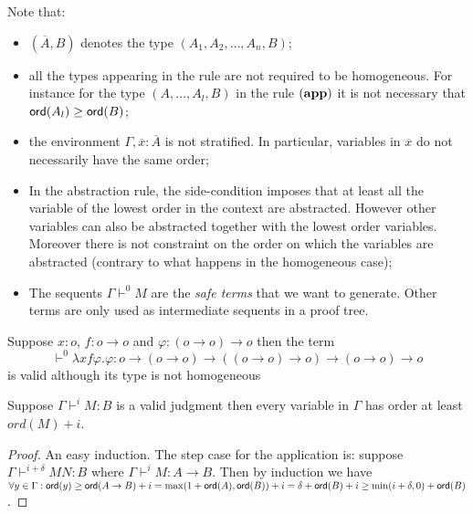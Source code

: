 Note that:
\begin{itemize}
\item $(\overline{A},B)$ denotes the type $(A_1,A_2, \ldots, A_n, B)$;
\item all the types appearing in the rule are not required to be homogeneous. For instance
for the type $(A,\ldots,A_l,B)$ in the rule $\mathbf{(app)}$ it is not necessary that ${\sf ord}(A_l) \geq {\sf ord}(B)$;
\item the environment $\Gamma, \overline{x}:\overline{A}$ is not stratified. In particular, variables in $\overline{x}$ do not necessarily have the same order;
\item In the abstraction rule, the side-condition imposes that at least all the variable of the lowest order
in the context are abstracted. However other variables can also be
abstracted together with the lowest order variables. Moreover there
is not constraint on the order on which the variables are abstracted
(contrary to what happens in the homogeneous case);
\item The sequents $\Gamma \vdash^0 M$ are the \emph{safe terms} that we want to generate.
Other terms are only used as intermediate sequents in a proof tree.
\end{itemize}


\begin{exmp}
Suppose $x:o$, $f:o\rightarrow o$ and $\varphi:(o\rightarrow
o)\rightarrow o$ then the term $$\vdash^0 \lambda x f \varphi .
\varphi : o \rightarrow (o\rightarrow o) \rightarrow ((o\rightarrow
o)\rightarrow o) \rightarrow (o\rightarrow o)\rightarrow o$$ is
valid although its type is not homogeneous
\end{exmp}


\begin{lem}
\label{lem:nonhomosafe_basic_prop} Suppose $\Gamma \vdash^i M : B$
is a valid judgment then every variable in $\Gamma$ has order at
least $ord(M)+i$.
\end{lem}
\begin{proof}
An easy induction. The step case for the application is: suppose
$\Gamma \vdash^{i+\delta} M N : B$ where $\Gamma \vdash^i M :
A\rightarrow B$. Then by induction we have $\forall y \in \Gamma :
{\sf ord}(y) \geq {\sf ord}(A\rightarrow B) + i = \max(1+{\sf ord}(A), {\sf ord}(B))+i =
\delta + {\sf ord}(B) + i \geq \min(i+\delta,0) + {\sf ord}(B)$.
\end{proof}

